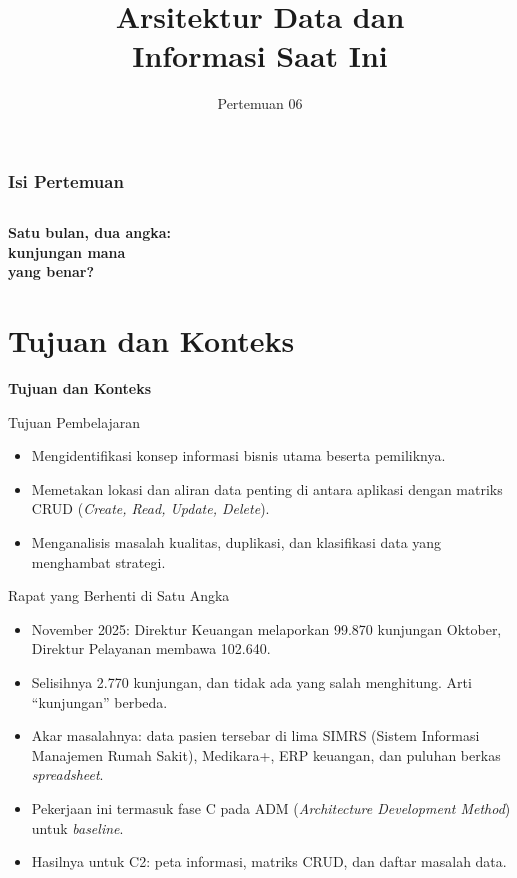 \documentclass[aspectratio=169, table, 12pt]{beamer}
\title{\Huge Arsitektur Data dan\\ \vspace{10pt} Informasi Saat Ini}
\date{Pertemuan 06}
\begin{document}
\frame{\titlepage}

\begin{frame}
  \frametitle{Isi Pertemuan}
  \vspace{14pt}
  \begin{columns}[t]
    {\small\tableofcontents[sections={1-3}]}

    {\small\tableofcontents[sections={4-6}]}
  \end{columns}
\end{frame}

\begin{frame}{\hfill}
  \centering
  \Huge{\textbf{Satu bulan, dua angka:\\kunjungan mana\\yang benar?}}
\end{frame}

\section{Tujuan dan Konteks}

\begin{frame}{\hfill}
  \centering
  \Huge{\textbf{Tujuan dan Konteks}}
\end{frame}

\begin{frame}{{\Large Tujuan Pembelajaran}}
  \vspace{10pt}
  \begin{itemize}
    \item Mengidentifikasi konsep informasi bisnis utama beserta pemiliknya.
    \item Memetakan lokasi dan aliran data penting di antara aplikasi dengan matriks CRUD
          (\textit{Create, Read, Update, Delete}).
    \item Menganalisis masalah kualitas, duplikasi, dan klasifikasi data yang menghambat strategi.
  \end{itemize}
\end{frame}

\begin{frame}{{\Large Rapat yang Berhenti di Satu Angka}}
  \vspace{6pt}
  \small
  \begin{itemize}
    \item November 2025: Direktur Keuangan melaporkan 99.870 kunjungan Oktober, Direktur Pelayanan
          membawa 102.640.
    \item Selisihnya 2.770 kunjungan, dan tidak ada yang salah menghitung. Arti ``kunjungan'' berbeda.
    \item Akar masalahnya: data pasien tersebar di lima SIMRS (Sistem Informasi Manajemen Rumah Sakit),
          Medikara+, ERP keuangan, dan puluhan berkas \textit{spreadsheet}.
    \item Pekerjaan ini termasuk fase C pada ADM (\textit{Architecture Development Method}) untuk
          \textit{baseline}.
    \item Hasilnya untuk C2: peta informasi, matriks CRUD, dan daftar masalah data.
  \end{itemize}
\end{frame}
\end{document}
